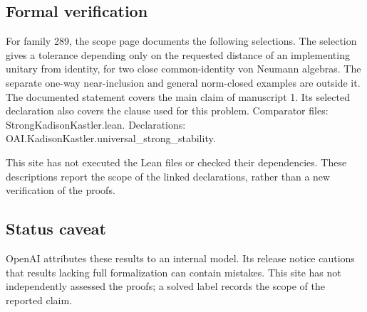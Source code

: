 \documentclass[11pt]{article}
\begin{document}
\subsection{Formal verification}
For family 289, the scope page documents the following selections. The selection gives a tolerance depending only on the requested distance of an implementing unitary from identity, for two close common-identity von Neumann algebras. The separate one-way near-inclusion and general norm-closed examples are outside it. The documented statement covers the main claim of manuscript 1. Its selected declaration also covers the clause used for this problem. Comparator files: StrongKadisonKastler.lean. Declarations: OAI.KadisonKastler.universal\_strong\_stability.

This site has not executed the Lean files or checked their dependencies. These descriptions report the scope of the linked declarations, rather than a new verification of the proofs.

\subsection{Status caveat}
OpenAI attributes these results to an internal model. Its release notice cautions that results lacking full formalization can contain mistakes. This site has not independently assessed the proofs; a solved label records the scope of the reported claim.
\end{document}
